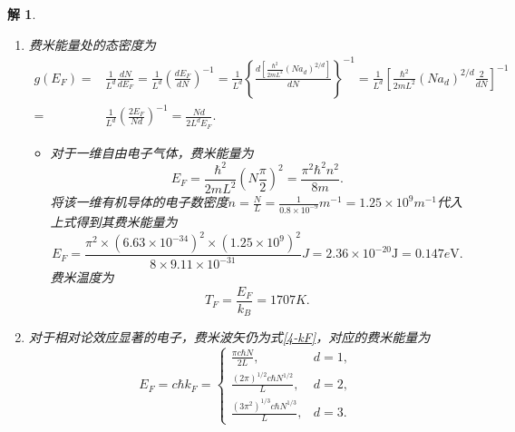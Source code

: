 \documentclass[UTF8,10pt,a4paper]{article}
\theoremstyle{Problem}
\theoremstyle{Solution}
\newtheorem*{sol}{解}
\begin{document}
\begin{sol}
\begin{enumerate}
\begin{equation}
            a_d=\frac{(2\pi)^dd}{2a_d'}=\left\{\begin{array}{ll}
                \frac{\pi}{2},&d=1,\\
                2\pi,&d=2,\\
                3\pi^2,&d=3.
            \end{array}\right.
        \end{equation}
        \item[(b)] 费米能量处的态密度为
        \begin{align}
            \nonumber g(E_F)=&\frac{1}{L^d}\frac{dN}{dE_F}=\frac{1}{L^d}\left(\frac{dE_F}{dN}\right)^{-1}=\frac{1}{L^d}\left\{\frac{d\left[\frac{\hbar^2}{2mL^2}(Na_d)^{2/d}\right]}{dN}\right\}^{-1}=\frac{1}{L^d}\left[\frac{\hbar^2}{2mL^2}(Na_d)^{2/d}\frac{2}{dN}\right]^{-1}\\
            =&\frac{1}{L^d}\left(\frac{2E_F}{Nd}\right)^{-1}=\frac{Nd}{2L^dE_F}.
        \end{align}
        \begin{itemize}
            \item[$\triangleright$] 对于一维自由电子气体，费米能量为
            \begin{equation}
                E_F=\frac{\hbar^2}{2mL^2}\left(N\frac{\pi}{2}\right)^2=\frac{\pi^2\hbar^2n^2}{8m}.
            \end{equation}
            将该一维有机导体的电子数密度$n=\frac{N}{L}=\frac{1}{0.8\times 10^{-9}}m^{-1}=1.25\times 10^9m^{-1}$代入上式得到其费米能量为
            \begin{equation}
                E_F=\frac{\pi^2\times(6.63\times 10^{-34})^2\times(1.25\times 10^9)^2}{8\times 9.11\times 10^{-31}}J=2.36\times 10^{-20}\text{J}=0.147e\text{V}.
            \end{equation}
            费米温度为
            \begin{equation}
                T_F=\frac{E_F}{k_B}=1707K.
            \end{equation}
        \end{itemize}
        \item[(c)] 对于相对论效应显著的电子，费米波矢仍为式\eqref{4-kF}，对应的费米能量为
        \begin{equation}
            E_F=c\hbar k_F=\left\{\begin{array}{ll}
                \frac{\pi c\hbar N}{2L},&d=1,\\
                \frac{(2\pi)^{1/2}c\hbar N^{1/2}}{L},&d=2,\\
                \frac{(3\pi^2)^{1/3}c\hbar N^{1/3}}{L},&d=3.

\end{array}
\end{equation}
\end{enumerate}
\end{sol}
\end{document}
